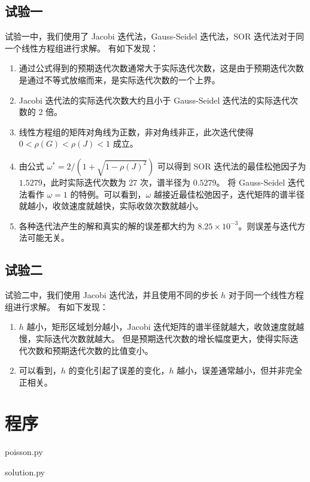 \documentclass{article}
\begin{document}
\subsection{试验一}
试验一中，我们使用了 Jacobi 迭代法，Gauss-Seidel 迭代法，SOR 迭代法对于同一个线性方程组进行求解。
有如下发现：
\begin{enumerate}
    \item 通过公式得到的预期迭代次数通常大于实际迭代次数，这是由于预期迭代次数是通过不等式放缩而来，是实际迭代次数的一个上界。
    \item Jacobi 迭代法的实际迭代次数大约且小于 Gauss-Seidel 迭代法的实际迭代次数的 2 倍。
    \item 线性方程组的矩阵对角线为正数，非对角线非正，此次迭代使得 $0<\rho(G)<\rho(J)<1$ 成立。
    \item 由公式 $\omega^*=2/(1+\sqrt{1-\rho(J)^2})$ 可以得到 SOR 迭代法的最佳松弛因子为 $1.5279$，此时实际迭代次数为 27 次，谱半径为 $0.5279$。
          将 Gauss-Seidel 迭代法看作 $\omega=1$ 的特例。可以看到，$\omega$ 越接近最佳松弛因子，迭代矩阵的谱半径就越小，收敛速度就越快，实际收敛次数就越小。
    \item 各种迭代法产生的解和真实的解的误差都大约为 $8.25\times10^{-3}$。则误差与迭代方法可能无关。
\end{enumerate}

\subsection{试验二}
试验二中，我们使用 Jacobi 迭代法，并且使用不同的步长 $h$ 对于同一个线性方程组进行求解。
有如下发现：
\begin{enumerate}
    \item $h$ 越小，矩形区域划分越小，Jacobi 迭代矩阵的谱半径就越大，收敛速度就越慢，实际迭代次数就越大。
          但是预期迭代次数的增长幅度更大，使得实际迭代次数和预期迭代次数的比值变小。
    \item 可以看到，$h$ 的变化引起了误差的变化，$h$ 越小，误差通常越小，但并非完全正相关。
\end{enumerate}

\section{程序}
poisson.py


solution.py

\end{document}
